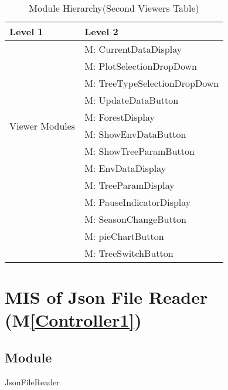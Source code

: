 \documentclass[12pt, titlepage]{article}
\newcounter{mnum}
\newcommand{\mthemnum}{M\themnum}
\newcommand{\mref}[1]{M\ref{#1}}
\begin{document}
\begin{table}[H]
\caption{Module Hierarchy(Second Viewers Table)}
\label{TblViewers2}

\centering
\begin{tabular}{p{} p{}}
\toprule
\textbf{Level 1} & \textbf{Level 2}\\
\midrule

\multirow{10}{0.3\textwidth}{Viewer Modules}
& {mnum} \mthemnum \label{Viwer14}: CurrentDataDisplay \\
& {mnum} \mthemnum \label{Viwer15}: PlotSelectionDropDown \\
& {mnum} \mthemnum \label{Viwer16}: TreeTypeSelectionDropDown \\
& {mnum} \mthemnum \label{Viwer17}: UpdateDataButton \\
& {mnum} \mthemnum \label{Viwer18}: ForestDisplay \\
& {mnum} \mthemnum \label{Viwer19}: ShowEnvDataButton \\
& {mnum} \mthemnum \label{Viwer20}: ShowTreeParamButton \\
& {mnum} \mthemnum \label{Viwer21}: EnvDataDisplay \\
& {mnum} \mthemnum \label{Viwer22}: TreeParamDisplay \\
& {mnum} \mthemnum \label{Viwer23}: PauseIndicatorDisplay \\
& {mnum} \mthemnum \label{Viwer24}: SeasonChangeButton \\
& {mnum} \mthemnum \label{Viwer25}: pieChartButton \\
& {mnum} \mthemnum \label{Viwer26}: TreeSwitchButton \\
\bottomrule
\end{tabular}
\end{table}

\newpage
\newcommand{\bref}{\href{https://docs.unity3d.com/Packages/com.unity.ugui@1.0/manual/script-Button.html}{here}}
\section{MIS of Json File Reader (\mref{Controller1})} 

\subsection{Module}
JsonFileReader
\end{document}
